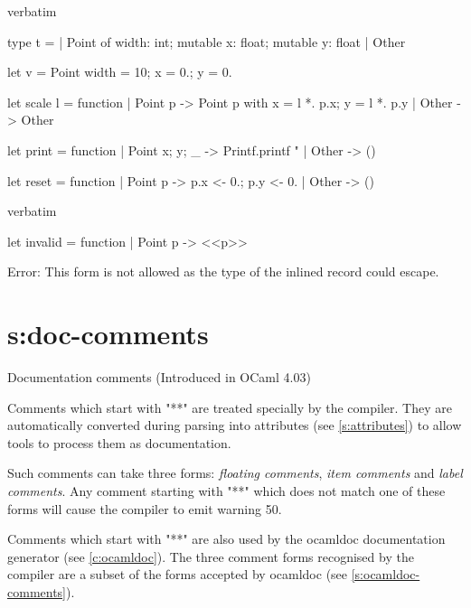 {\begin{camlexample}{verbatim}
\begin{caml}
\begin{camlinput}
type t =
  | Point of {width: int; mutable x: float; mutable y: float}
  | Other

let v = Point {width = 10; x = 0.; y = 0.}

let scale l = function
  | Point p -> Point {p with x = l *. p.x; y = l *. p.y}
  | Other -> Other

let print = function
  | Point {x; y; _} -> Printf.printf "%
  | Other -> ()

let reset = function
  | Point p -> p.x <- 0.; p.y <- 0.
  | Other -> ()
\end{camlinput}
\end{caml}
\end{camlexample}

\begin{camlexample}{verbatim}
\begin{caml}
\begin{camlinput}
let invalid = function
  | Point p -> <<p>>
\end{camlinput}
\begin{camlerror}
Error: This form is not allowed as the type of the inlined record could escape.
\end{camlerror}
\end{caml}
\end{camlexample}

\section{s:doc-comments}{Documentation comments}
(Introduced in OCaml 4.03)

Comments which start with "**" are treated specially by the
compiler. They are automatically converted during parsing into
attributes (see \ref{s:attributes}) to allow tools to process them as
documentation.

Such comments can take three forms: {\em floating comments}, {\em item
comments} and {\em label comments}. Any comment starting with "**" which
does not match one of these forms will cause the compiler to emit
warning 50.

Comments which start with "**" are also used by the ocamldoc
documentation generator (see \ref{c:ocamldoc}). The three comment forms
recognised by the compiler are a subset of the forms accepted by
ocamldoc (see \ref{s:ocamldoc-comments}).

}
